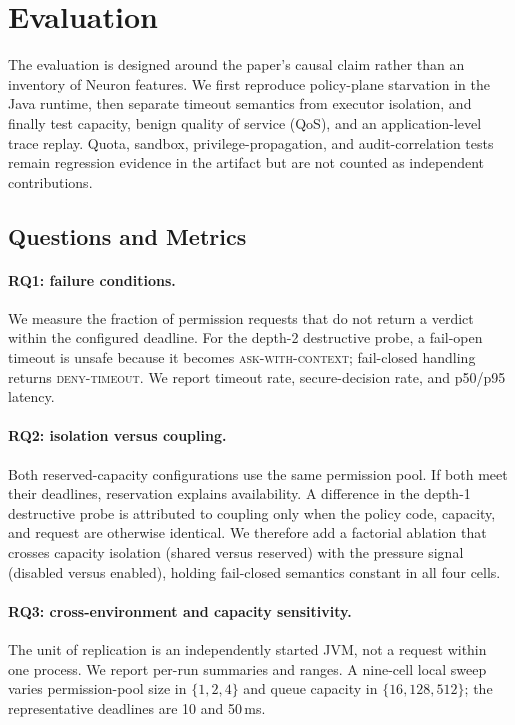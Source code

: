 \section{Evaluation}
\label{sec:eval}
\label{sec:eval-setup}
\label{sec:eval-cross}
\label{sec:eval-adaptive}
\label{sec:eval-adaptive-threshold}
\label{sec:eval-resource}
\label{sec:eval-supplement}

The evaluation is designed around the paper's causal claim rather than an
inventory of Neuron features. We first reproduce policy-plane starvation in
the Java runtime, then separate timeout semantics from executor isolation,
and finally test capacity, benign quality of service (QoS), and an
application-level trace replay. Quota, sandbox, privilege-propagation, and
audit-correlation tests remain regression evidence in the artifact but are not
counted as independent contributions.

\subsection{Questions and Metrics}

\paragraph{RQ1: failure conditions.}
We measure the fraction of permission requests that do not return a verdict
within the configured deadline. For the depth-2 destructive probe, a fail-open
timeout is unsafe because it becomes \textsc{ask-with-context}; fail-closed
handling returns \textsc{deny-timeout}. We report timeout rate, secure-decision
rate, and p50/p95 latency.

\paragraph{RQ2: isolation versus coupling.}
Both reserved-capacity configurations use the same permission pool. If both
meet their deadlines, reservation explains availability. A difference in the
depth-1 destructive probe is attributed to coupling only when the policy code,
capacity, and request are otherwise identical. We therefore add a factorial
ablation that crosses capacity isolation (shared versus reserved) with the
pressure signal (disabled versus enabled), holding fail-closed semantics
constant in all four cells.

\paragraph{RQ3: cross-environment and capacity sensitivity.}
The unit of replication is an independently started JVM, not a request within
one process. We report per-run summaries and ranges. A nine-cell local sweep
varies permission-pool size in $\{1,2,4\}$ and queue capacity in
$\{16,128,512\}$; the representative deadlines are 10 and 50\,ms.

